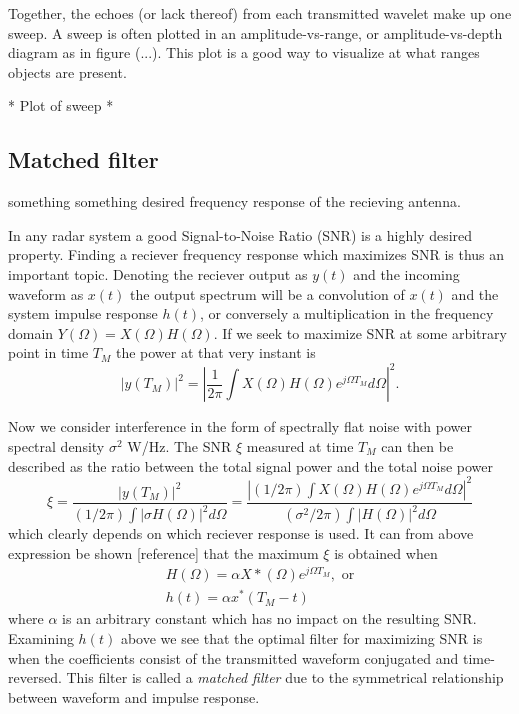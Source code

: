 \documentclass[a4paper, 12pt]{article}
\begin{document}
Together, the echoes (or lack thereof) from each transmitted wavelet make up one sweep. A sweep is often plotted in an amplitude-vs-range, or amplitude-vs-depth diagram as in figure (...). This plot is a good way to visualize at what ranges objects are present.

* Plot of sweep *

\subsection{Matched filter}

something something desired frequency response of the recieving antenna. 

In any radar system a good Signal-to-Noise Ratio (SNR) is a highly desired property. Finding a reciever frequency response which maximizes SNR is thus an important topic. Denoting the reciever output as $y(t)$ and the incoming waveform as $x(t)$ the output spectrum will be a convolution of $x(t)$ and the system impulse response $h(t)$, or conversely a multiplication in the frequency domain $Y(\Omega) = X(\Omega)H(\Omega)$. If we seek to maximize SNR at some arbitrary point in time $T_M$ the power at that very instant is
%
\begin{equation}
	|y(T_M)|^{2} = |\frac{1}{2\pi}\int X(\Omega)H(\Omega)e^{j\Omega T_M} d\Omega|^{2}.
\end{equation}

Now we consider interference in the form of spectrally flat noise with power spectral density $\sigma^2$ W/Hz. The SNR $\xi$ measured at time $T_M$ can then be described as the ratio between the total signal power and the total noise power
%
\begin{equation}
	\xi
	= \frac{|y(T_M)|^{2}}{(1/2\pi)\int|\sigma H(\Omega)|^{2}d\Omega}
	= \frac{|(1/2\pi)\int X(\Omega)H(\Omega)e^{j\Omega T_M}d\Omega|^2}{(\sigma^2/2\pi)\int|H(\Omega)|^{2}d\Omega}
\end{equation}
%
which clearly depends on which reciever response is used. It can from above expression be shown [reference] that the maximum $\xi$ is obtained when 
%
\begin{gather}
 H(\Omega) = \alpha X*(\Omega)e^{j\Omega T_M}, \text{ or} \\
\label{eq:123}
h(t) = \alpha x^*(T_M - t)
\end{gather}
%
where $\alpha$ is an arbitrary constant which has no impact on the resulting SNR. Examining $h(t)$ above we see that the optimal filter for maximizing SNR is when the coefficients consist of the transmitted waveform conjugated and time-reversed. This filter is called a \emph{matched filter} due to the symmetrical relationship between waveform and impulse response.
\end{document}
